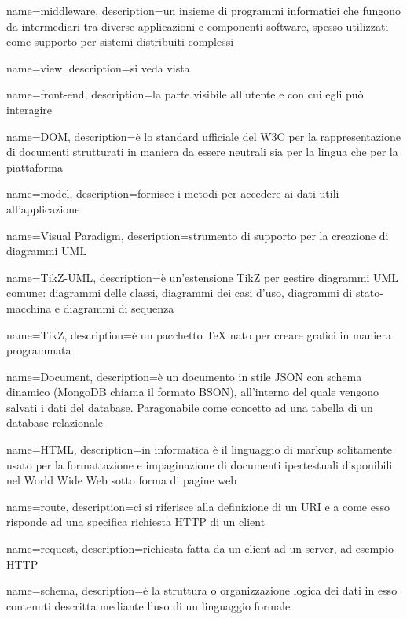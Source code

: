  {
	name=middleware,
	description={un insieme di programmi informatici che fungono da intermediari tra diverse applicazioni e componenti software,  spesso utilizzati come supporto per sistemi distribuiti complessi}
}

 {
	name=view,
	description={si veda vista}
}

 {
	name=front-end,
	description={la parte visibile all'utente e con cui egli può interagire}
}

 {
	name=DOM,
	description={è lo standard ufficiale del W3C per la rappresentazione di documenti strutturati in maniera da essere neutrali sia per la lingua che per la piattaforma}
}

 {
	name=model,
	description={fornisce i metodi per accedere ai dati utili all'applicazione}
}

 {
	name=Visual Paradigm,
	description={strumento di supporto per la creazione di diagrammi UML}
}

 {
	name=TikZ-UML,
	description={è un'estensione TikZ per gestire diagrammi UML comune: diagrammi delle classi, diagrammi dei casi d'uso, diagrammi di stato-macchina e diagrammi di sequenza}
}

 {
	name=TikZ,
	description={è un pacchetto TeX nato per creare grafici in maniera programmata}
}

 {
	name=Document,
	description={è un documento in stile JSON con schema dinamico (MongoDB chiama il formato BSON), all'interno del quale vengono salvati i dati del database. Paragonabile come concetto ad una tabella di un database relazionale}
}

 {
	name=HTML,
	description={in informatica è il linguaggio di markup solitamente usato per la formattazione e impaginazione di documenti ipertestuali disponibili nel World Wide Web sotto forma di pagine web}
}

 {
	name=route,
	description={ci si riferisce alla definizione di un URI e a come esso risponde ad una specifica richiesta HTTP di un client}
}

 {
	name=request,
	description={richiesta fatta da un client ad un server, ad esempio HTTP}
}

 {
	name=schema,
	description={è la struttura o organizzazione logica dei dati in esso contenuti descritta mediante l'uso di un linguaggio formale}
}

